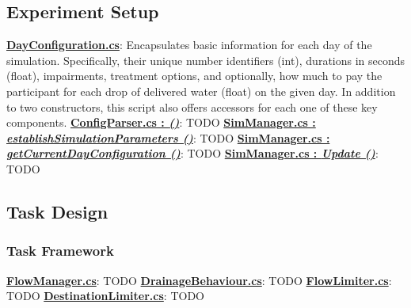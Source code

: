 \documentclass{article}
\begin{document}
\subsection*{Experiment Setup} %
\href{https://bit.ly/2FvRTWR}{\textbf{DayConfiguration.cs}}: Encapsulates basic information for each day of the simulation. Specifically, their unique number identifiers (int), durations in seconds (float), impairments, treatment options, and optionally, how much to pay the participant for each drop of delivered water (float) on the given day. In addition to two constructors, this script also offers accessors for each one of these key components. \newline \newline
\href{https://bit.ly/2TZaLYj}{\textbf{ConfigParser.cs : \textit{ ()}}}: TODO \newline \newline
\href{https://bit.ly/2UhmSzq}{\textbf{SimManager.cs : \textit{establishSimulationParameters ()}}}: TODO \newline \newline
\href{https://bit.ly/2UhmSzq}{\textbf{SimManager.cs : \textit{getCurrentDayConfiguration ()}}}: TODO \newline \newline
\href{https://bit.ly/2UhmSzq}{\textbf{SimManager.cs : \textit{Update ()}}}: TODO 

\subsection*{Task Design}
\subsubsection*{Task Framework} %
\href{https://bit.ly/2WrbyxT}{\textbf{FlowManager.cs}}: TODO \newline \newline
\href{https://bit.ly/2YtMEjd}{\textbf{DrainageBehaviour.cs}}: TODO \newline \newline
\href{https://bit.ly/2TUX1h4}{\textbf{FlowLimiter.cs}}: TODO \newline \newline
\href{https://bit.ly/2JGhr8M}{\textbf{DestinationLimiter.cs}}: TODO 
\end{document}
